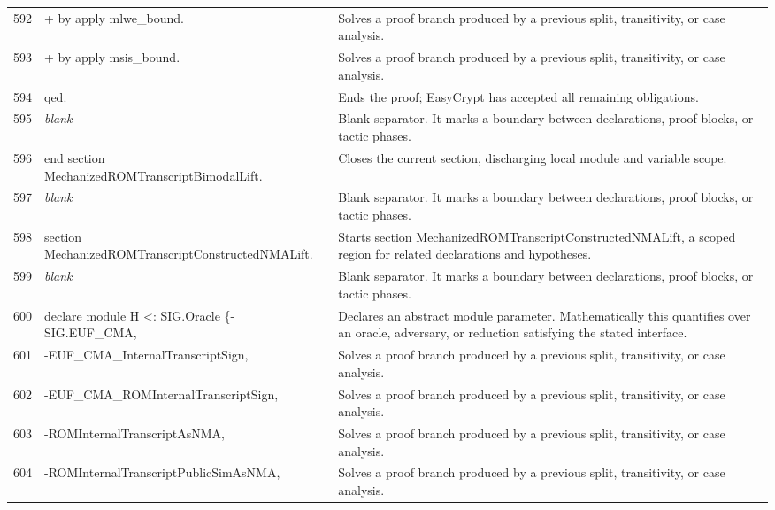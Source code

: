 \documentclass[10pt]{article}
\begin{document}
\begin{longtable}{r L{0.53\textwidth} L{0.37\textwidth}}
592 & {\ttfamily\scriptsize + by apply mlwe\_bound.} & Solves a proof branch produced by a previous split, transitivity, or case analysis. \\
593 & {\ttfamily\scriptsize + by apply msis\_bound.} & Solves a proof branch produced by a previous split, transitivity, or case analysis. \\
594 & {\ttfamily\scriptsize qed.} & Ends the proof; EasyCrypt has accepted all remaining obligations. \\
595 & {\ttfamily\scriptsize \emph{blank}} & Blank separator.  It marks a boundary between declarations, proof blocks, or tactic phases. \\
596 & {\ttfamily\scriptsize end section MechanizedROMTranscriptBimodalLift.} & Closes the current section, discharging local module and variable scope. \\
597 & {\ttfamily\scriptsize \emph{blank}} & Blank separator.  It marks a boundary between declarations, proof blocks, or tactic phases. \\
598 & {\ttfamily\scriptsize section MechanizedROMTranscriptConstructedNMALift.} & Starts section MechanizedROMTranscriptConstructedNMALift, a scoped region for related declarations and hypotheses. \\
599 & {\ttfamily\scriptsize \emph{blank}} & Blank separator.  It marks a boundary between declarations, proof blocks, or tactic phases. \\
600 & {\ttfamily\scriptsize declare module H <: SIG.Oracle \{-SIG.EUF\_CMA,} & Declares an abstract module parameter.  Mathematically this quantifies over an oracle, adversary, or reduction satisfying the stated interface. \\
601 & {\ttfamily\scriptsize                                  -EUF\_CMA\_InternalTranscriptSign,} & Solves a proof branch produced by a previous split, transitivity, or case analysis. \\
602 & {\ttfamily\scriptsize                                  -EUF\_CMA\_ROMInternalTranscriptSign,} & Solves a proof branch produced by a previous split, transitivity, or case analysis. \\
603 & {\ttfamily\scriptsize                                  -ROMInternalTranscriptAsNMA,} & Solves a proof branch produced by a previous split, transitivity, or case analysis. \\
604 & {\ttfamily\scriptsize                                  -ROMInternalTranscriptPublicSimAsNMA,} & Solves a proof branch produced by a previous split, transitivity, or case analysis. \\

\end{longtable}
\end{document}
